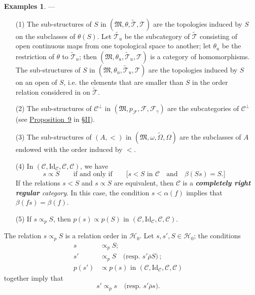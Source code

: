 \documentclass[a4paper,fleqn]{article}
\theoremstyle{plain}
\newenvironment{theorem}[1]
  {\renewcommand\theinnertheorem{#1}\innertheorem}
  {\endinnertheorem}
\theoremstyle{definition}
\newtheorem*{examples}{Examples}
\newcommand{\oldpage}[1]{{\marginpar{\footnotesize$\bigg\vert$\,\,\,\,\textit{p.~#1}}}}
\newcommand{\unsure}[1]{{\color{purple}\textbf{#1}}}
\newcommand{\textand}{\quad\text{and}\quad}
\newcommand{\CC}{\mathcal{C}}
\newcommand{\HH}{\mathcal{H}}
\newcommand{\MM}{\mathfrak{M}}
\newcommand{\FF}{\mathcal{F}}
\newcommand{\TT}{\mathcal{T}}
\newcommand{\tTT}{\widetilde{\TT}}
\newcommand{\relrhobar}{\mathrel{\overline{\rho}}}
\newcommand{\subs}{\mathrel{\propto}}
\newcommand{\Id}{\mathrm{Id}}
\begin{document}
\begin{examples}
  ---
  \begin{enumerate}
    \item[\normalfont(1)]
      The sub-structures of $S$ in $(\MM,\theta,\tTT,\TT)$ are the topologies induced by $S$ on the subclasses of $\theta(S)$.
      Let $\widetilde{\TT_u}$ be the subcategory of $\tTT$ consisting of open continuous maps from one topological space to another;
      let $\theta_u$ be the restriction of $\theta$ to $\tTT_u$;
      then $(\MM,\theta_u,\tTT_u,\TT)$ is a category of homomorphisms.
      The sub-structures of $S$ in $(\MM,\theta_u,\tTT_u,\TT)$ are the topologies induced by $S$ on an open of $S$, i.e. the elements that are smaller than $S$ in the order relation considered in \cite{3c} on $\tTT$.
    \item[\normalfont(2)]
      The sub-structures of $\CC^\perp$ in $(\MM,p_\FF,\FF,\FF_\gamma)$ are the subcategories of $\CC^\perp$ (see \hyperref[proposition:i-9]{Proposition~9} in \hyperref[section:ii]{§II}).
    \item[\normalfont(3)]
      The sub-structures of $(A,<)$ in $(\MM,\omega,\widetilde{\Omega},\Omega)$ are the subclasses of $A$ endowed with the order induced by $<$.
    \item[\normalfont(4)]
      In $(\CC,\Id_\CC,\CC,\CC)$, we have
      \[
        s\subs S
        \qquad\text{if and only if}\qquad
        \big[
          \text{$s<S$ in $\CC$}
          \textand
          \beta(Ss)=S.
        \big]
      \]
      If the relations $s<S$ and $s\subs S$ are equivalent, then $\CC$ is a \emph{\unsure{completely right regular} category}.
      In this case, the condition $s<\alpha(f)$ implies that $\beta(fs)=\beta(f)$.
    \item[\normalfont(5)]
      If $s\subs_p S$, then $p(s)\subs p(S)$ in $(\CC,\Id_\CC,\CC,\CC)$.
  \end{enumerate}
\end{examples}

\begin{theorem}{1}
\label{theorem:i-1}
  \oldpage{362}
  The relation $s\subs_p S$ is a relation order in $\HH_0$.
  Let $s,s',S\in\HH_0$;
  the conditions
  \[
    \begin{aligned}
      s&\subs_p S;
    \\s'&\subs_p S
      \quad\text{(resp. $s'\relrhobar S$)}\,;
    \\p(s')&\subs p(s)\text{ in }(\CC,\Id_\CC,\CC,\CC)
    \end{aligned}
  \]
  together imply that
  \[
    s'\subs_p s
    \quad\text{(resp. $s'\relrhobar s$)}.
  \]
\end{theorem}
\end{document}
